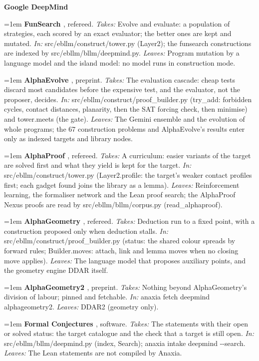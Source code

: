 \par\begingroup\footnotesize\raggedright\setlength{\parindent}{0pt}\setlength{\parskip}{2pt plus 1pt}%
\def\sourcegroup#1{\par\addvspace{4pt}\textbf{#1}\par\nobreak}%
\def\sourceentry#1#2#3#4{\par\hangindent=1em\hangafter=1 \textbf{#1}, #2. \emph{Takes:} #3 \emph{Leaves:} #4\par}%
\sourcegroup{Google DeepMind}
\sourceentry{FunSearch \cite{RBN24}}{refereed}{Evolve and evaluate: a population of strategies, each scored by an exact evaluator; the better ones are kept and mutated. \emph{In:} src/ebllm/construct/tower.py (Layer2); the funsearch constructions are indexed by src/ebllm/bllm/deepmind.py.}{Program mutation by a language model and the island model: no model runs in construction mode.}
\sourceentry{AlphaEvolve \cite{NVE25}}{preprint}{The evaluation cascade: cheap tests discard most candidates before the expensive test, and the evaluator, not the proposer, decides. \emph{In:} src/ebllm/construct/proof\_builder.py (try\_add: forbidden cycles, contact distances, planarity, then the SAT forcing check, then minimise) and tower.meets (the gate).}{The Gemini ensemble and the evolution of whole programs; the 67 construction problems and AlphaEvolve's results enter only as indexed targets and library nodes.}
\sourceentry{AlphaProof \cite{HMS25}}{refereed}{A curriculum: easier variants of the target are solved first and what they yield is kept for the target. \emph{In:} src/ebllm/construct/tower.py (Layer2.profile: the target's weaker contact profiles first; each gadget found joins the library as a lemma).}{Reinforcement learning, the formaliser network and the Lean proof search; the AlphaProof Nexus proofs are read by src/ebllm/bllm/corpus.py (read\_alphaproof).}
\sourceentry{AlphaGeometry \cite{TWL24}}{refereed}{Deduction run to a fixed point, with a construction proposed only when deduction stalls. \emph{In:} src/ebllm/construct/proof\_builder.py (status: the shared colour spreads by forward rules; Builder.moves: attach, link and lemma moves when no closing move applies).}{The language model that proposes auxiliary points, and the geometry engine DDAR itself.}
\sourceentry{AlphaGeometry2 \cite{CTO25}}{preprint}{Nothing beyond AlphaGeometry's division of labour; pinned and fetchable. \emph{In:} anaxia fetch deepmind alphageometry2.}{DDAR2 (geometry only).}
\sourceentry{Formal Conjectures \cite{FCA25}}{software}{The statements with their open or solved status: the target catalogue and the check that a target is still open. \emph{In:} src/ebllm/bllm/deepmind.py (index, Search); anaxia intake deepmind -{}-search.}{The Lean statements are not compiled by Anaxia.}
